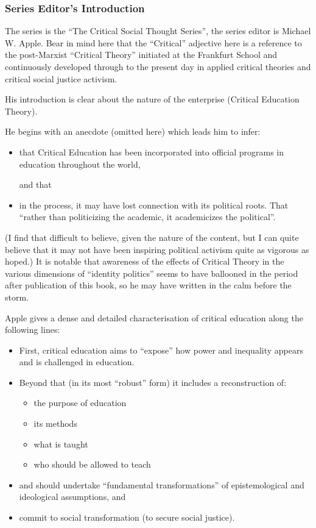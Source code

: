 \documentclass[10pt,titlepage]{book}
\begin{document}
\subsubsection{Series Editor's Introduction}

The series is the ``The Critical Social Thought Series'', the series editor is Michael W. Apple.
Bear in mind here that the ``Critical'' adjective here is a reference to the post-Marxist ``Critical Theory'' initiated at the Frankfurt School and continuously developed through to the present day in applied critical theories and critical social justice activism.

His introduction is clear about the nature of the enterprise (Critical Education Theory).

He begins with an anecdote (omitted here) which leads him to infer:

\begin{itemize}
\item that Critical Education has been incorporated into official programs in education throughout the world,

  and that
  
\item in the process, it may have lost connection with its political roots. That ``rather than politicizing the academic, it academicizes the political''.
\end{itemize}

(I find that difficult to believe, given the nature of the content, but I can quite believe that it may not have been inspiring political activism quite as vigorous as hoped.)
It is notable that awareness of the effects of Critical Theory in the various dimensions of ``identity politics'' seems to have ballooned in the period after publication of this book, so he may have written in the calm before the storm.

Apple gives a dense and detailed characterisation of critical education along the following lines:

\begin{itemize}
\item First, critical education aims to ``expose'' how power and inequality appears and is challenged in education.
\item Beyond that (in its most ``robust'' form) it includes a reconstruction of:
  \begin{itemize}
  \item the purpose of education
  \item its methods
  \item what is taught
  \item who should be allowed to teach
  \end{itemize}
\item and should undertake ``fundamental transformations'' of epistemological and ideological assumptions, and
  \item commit to social transformation (to secure social justice).
\end{itemize}
\end{document}
